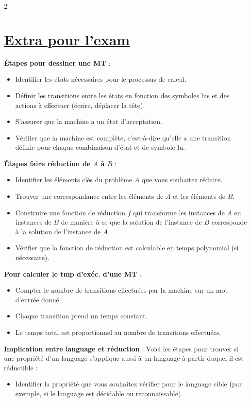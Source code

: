 \documentclass[11pt]{article}
\begin{document}
\begin{multicols}{2}
\section{\underline{Extra pour l'exam}}
\textbf{Étapes pour dessiner une MT} :
\begin{itemize}[noitemsep]
  \item Identifier les états nécessaires pour le processus de calcul.
  \item Définir les transitions entre les états en fonction des symboles lus et des actions à effectuer (écrire, déplacer la tête).
  \item S'assurer que la machine a un état d'acceptation.
  \item Vérifier que la machine est complète, c'est-à-dire qu'elle a une transition définie pour chaque combinaison d'état et de symbole lu.
\end{itemize}
\textbf{Étapes faire réduction de $A$ à $B$} :
\begin{itemize}[noitemsep]
  \item Identifier les éléments clés du problème $A$ que vous souhaitez réduire.
  \item Trouver une correspondance entre les éléments de $A$ et les éléments de $B$.
  \item Construire une fonction de réduction $f$ qui transforme les instances de $A$ en instances de $B$ de manière à ce que la solution de l'instance de $B$ corresponde à la solution de l'instance de $A$.
  \item Vérifier que la fonction de réduction est calculable en temps polynomial (si nécessaire).
\end{itemize}
\textbf{Pour calculer le tmp d'exéc. d'une MT} : 
\begin{itemize}[noitemsep]
  \item Compter le nombre de transitions effectuées par la machine sur un mot d'entrée donné.
  \item Chaque transition prend un temps constant.
  \item Le temps total est proportionnel au nombre de transitions effectuées.
\end{itemize}
\textbf{Implication entre language et réduction} : Voici les étapes pour trouver si une propriété d'un language s'applique aussi à un language à partir duquel il est réductible :
\begin{itemize}[noitemsep]
  \item Identifier la propriété que vous souhaitez vérifier pour le language cible (par exemple, si le language est décidable ou reconnaissable).

\end{itemize}
\end{multicols}
\end{document}

